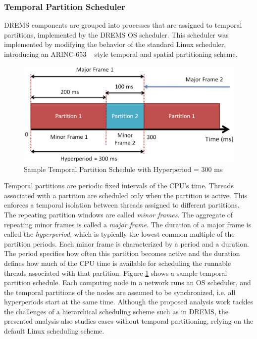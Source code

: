 \subsubsection{Temporal Partition Scheduler}

DREMS components are grouped into processes that are assigned to temporal partitions, implemented by the DREMS OS scheduler. This scheduler was implemented by modifying the behavior of the standard Linux scheduler, introducing an ARINC-653 ~\cite{ARINC-653} style temporal and spatial partitioning scheme. 

\begin{figure}[ht]
	\centering
	\includegraphics[width=\textwidth]{./figs/partition_scheduling}
	\caption{Sample Temporal Partition Schedule with Hyperperiod = 300 ms}
	\label{fig:partition_scheduling}
\end{figure}


Temporal partitions are periodic fixed intervals of the CPU's time. Threads associated with a partition are scheduled only when the partition is active. This enforces a temporal isolation between threads assigned to different partitions. The repeating partition windows are called \emph{minor frames}. The aggregate of repeating minor frames is called a \emph{major frame}. The duration of a major frame is called the \emph{hyperperiod}, which is typically the lowest common multiple of the partition periods. Each minor frame is characterized by a period and a duration. The period specifies how often this partition becomes active and the duration defines how much of the CPU time is available for scheduling the runnable threads associated with that partition. Figure \ref{fig:partition_scheduling} shows a sample temporal partition schedule. Each computing node in a network runs an OS scheduler, and the temporal partitions of the nodes are assumed to be synchronized, i.e. all hyperperiods start at the same time. Although the proposed analysis work tackles the challenges of a hierarchical scheduling scheme such as in DREMS, the presented analysis also studies cases without temporal partitioning, relying on the default Linux scheduling scheme.

